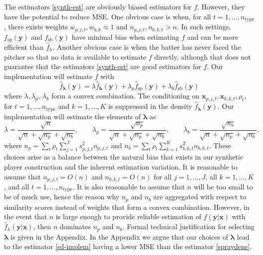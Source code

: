 \documentclass[12pt]{article}
\newcommand{\y}{\textbf{y}}
\newcommand{\x}{\textbf{x}}
\newcommand{\h}{\textbf{h}}
\newcommand{\lambdabf}{\boldsymbol{\lambda}}
\begin{document}
The estimators \eqref{synth-est} are obviously biased estimators for $f$. However, they have the potential to reduce MSE. One obvious case is when, for all
$t = 1,\ldots,n_{\text{type}}$, there exists weights
$w_{p,j,t}, w_{b,k} \approx 1$ and
$n_{p,j,t}, n_{b,k,t} > n$.
In such settings, $f_{\text{sp}}(\y)$ and $f_{\text{sb}}(\y)$ have minimal bias when estimating $f$ and can be more efficient than $\hat f_h$. Another obvious case is when the batter has never faced the pitcher so that no data is available to estimate $f$ directly, although that does not guarantee that the estimators \eqref{synth-est} are good estimators for $f$. Our implementation will estimate $f$ with
\begin{equation} \label{sd-implem}
  \hat{f}_{\lambdabf}(\y) = \lambda \hat f_\h(\y)
    + \lambda_p \hat f_{\text{sp}}(\y)
    + \lambda_b \hat f_{\text{sb}}(\y)
\end{equation}
where $\lambda,\lambda_p$, $\lambda_b$ form a convex combination. The conditioning on $\x_{p,j,t}, \x_{b,k,t}, \rho_t$, for $t = 1,\ldots,n_{\text{type}}$ and $k = 1,\ldots,K$ is suppressed in the density $\hat{f}_{\lambdabf}(\y)$.
Our implementation will estimate the elements of $\lambdabf$ as
$$
  \lambda = \frac{\sqrt{n}}{\sqrt{n} + \sqrt{n_p} + \sqrt{n_b}}, \qquad
  \lambda_p = \frac{\sqrt{n_p}}{\sqrt{n} + \sqrt{n_p} + \sqrt{n_b}}, \qquad
  \lambda_b = \frac{\sqrt{n_b}}{\sqrt{n} + \sqrt{n_p} + \sqrt{n_b}},
$$
where $n_p = \sum_t\rho_t\sum_{j=1}^J s_{p,j,t}^2n_{p,j,t}$ and
$n_b = \sum_t\rho_t\sum_{k=1}^K s_{b,k,t}^2n_{b,k,t}$.  These choices arise as a balance between the natural bias that exists in our synthetic player construction and the inherent estimation variation. %
It is reasonable to assume that $n_{p,j,t} = O(n)$ and $n_{b,k,t} = O(n)$ for all $j = 1,\ldots,J$, all $k = 1,\ldots,K$, and all $t = 1,\ldots,n_{\text{type}}$. It is also reasonable to assume that $n$ will be too small to be of much use, hence the reason why $n_p$ and $n_b$ are aggregated with respect to similarity scores instead of weights that form a convex combination. However, in the event that $n$ is large enough to provide reliable estimation of $f(\y|\x)$ with $\hat f_h(\y|\x)$, then $n$ dominates $n_p$ and $n_b$. Formal technical justification for selecting $\lambdabf$ is given in the Appendix. In the Appendix we argue that our choices of $\lambdabf$ lead to the estimator \eqref{sd-implem} having a lower MSE than the estimator \eqref{spraydens}.
\end{document}
